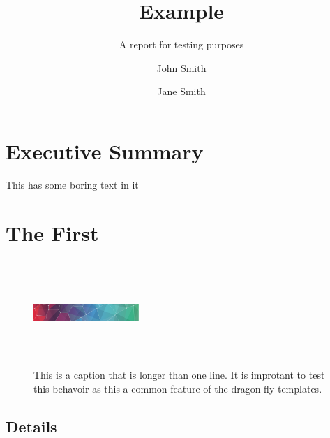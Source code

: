 \documentclass{dragonfly-report}
\title{Example}{An Example\\ Report}
\subtitle{A report for testing purposes}
\author[Smith, J. \and Smith J.]{John Smith \and Jane Smith}
\begin{document}
\maketitle
\tableofcontents

\section*{Executive Summary}
This has some boring text in it

\section{The First}
\lipsum[1]


\begin{figure}[h]
  \includegraphics[width=40mm,height=40mm]{pattern}
  \caption{This is a caption that is longer than one line. It is improtant to test 
  this behavoir as this a common feature of the dragon fly templates.}
\end{figure}

\subsection{Details}

\lipsum[2]
\end{document}
